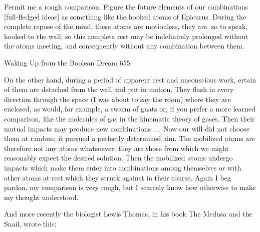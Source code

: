           Permit me a rough comparison. Figure the future elements of our
   combinations [full-fledged ideas] as something like the hooked atoms of
   Epicurus. During the complete repose of the mind, these atoms are motionless,
   they are, so to speak, hooked to the wall; so this complete rest may be
   indefinitely prolonged without the atoms meeting, and consequently without
   any combination between them.




Waking Up from the Boolean Dream                                                       655

         On the other hand, during a period of apparent rest and unconscious
  work, ertain of them are detached from the wall and put in motion. They flash in
  every direction through the space (I was about to say the room) where they are
  enclosed, as would, for example, a swarm of gnats or, if you prefer a more
  learned comparison, like the molecules of gas in the kinematic theory of gases.
  Then their mutual impacts may produce new combinations ....
         Now our will did not choose them at random; it pursued a perfectly
  determined aim. The mobilized atoms are therefore not any atoms whatsoever;
  they are those from which we might reasonably expect the desired solution.
  Then the mobilized atoms undergo impacts which make them enter into
  combinations among themselves or with other atoms at rest which they struck
  against in their course. Again I beg pardon, my comparison is very rough, but I
  scarcely know how otherwise to make my thought understood.

       And more recently the biologist Lewis Thomas, in his book The Medusa and
the Snail, wrote this:

